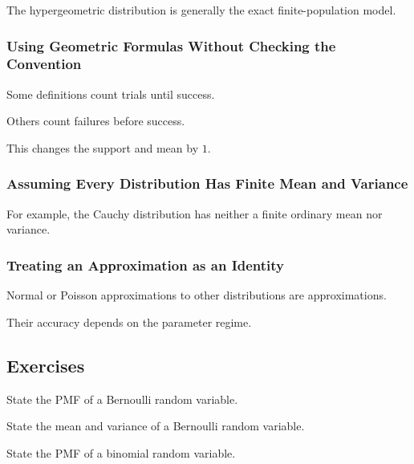 The hypergeometric distribution is generally the exact finite-population
model.

\subsubsection{Using Geometric Formulas Without Checking the Convention}

Some definitions count trials until success.

Others count failures before success.

This changes the support and mean by \(1\).

\subsubsection{Assuming Every Distribution Has Finite Mean and Variance}

For example, the Cauchy distribution has neither a finite ordinary mean nor
variance.

\subsubsection{Treating an Approximation as an Identity}

Normal or Poisson approximations to other distributions are approximations.

Their accuracy depends on the parameter regime.

\subsection{Exercises}
\label{subsec:probability-distributions-exercises}

\begin{exercise}[1]
State the PMF of a Bernoulli random variable.
\end{exercise}

\begin{exercise}[1]
State the mean and variance of a Bernoulli random variable.
\end{exercise}

\begin{exercise}[1]
State the PMF of a binomial random variable.
\end{exercise}

